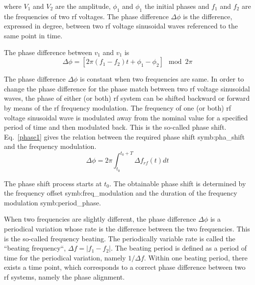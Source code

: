 where $V_1$ and $V_2$ are the amplitude, $\phi_1$ and $\phi_1$ the initial phases and $f_1$ and $f_2$ are the frequencies of two rf voltages. The phase difference $\Delta \phi$ is the difference, expressed in degree, between two rf voltage sinusoidal waves referenced to the same point in time. 


The phase difference between $v_1$ and $v_1$ is
\begin{equation}
	\Delta \phi=[2\pi(f_1-f_2)t+\phi_1-\phi_2] \mod 2\pi\label{phase_diff_general}
\end{equation}

The phase difference $\Delta \phi$ is constant when two frequencies are same. In order to change the phase difference for the phase match between two rf voltage sinusoidal waves, the phase of either (or both) rf system can be shifted backward or forward by means of the rf frequency modulation. The frequency of one (or both) rf voltage sinusoidal wave is modulated away from the nominal value for a specified period of time and then modulated back. This is the so-called phase shift. Eq.~\ref{phase1} gives the relation between the required phase shift \gls{symb:pha_shift} and the frequency modulation. 
\begin{equation}
\Delta \phi= 2\pi \int_{t_0}^{t_0+T} \Delta f_{rf}(t)dt \label{phase1}
\end{equation}

The phase shift process starts at $t_0$. The obtainable phase shift is determined by the frequency offset \gls{symb:freq_modulation} and the duration of the frequency modulation \gls{symb:period_phase}. 

When two frequencies are slightly different, the phase difference $\Delta \phi$ is a periodical variation whose rate is the difference between the two frequencies. This is the so-called frequency beating. The periodically variable rate is called the ``beating frequency``, $\Delta f=|f_1-f_2|$. The beating period is defined as a period of time for the periodical variation, namely $1/\Delta f$. Within one beating period, there exists a time point, which corresponds to a correct phase difference between two rf systems, namely the phase alignment. 

